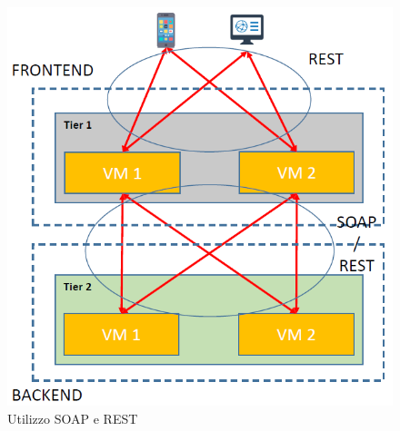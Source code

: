 \documentclass{article}
\begin{document}
\begin{figure}[H]
\centering
\includegraphics[scale=0.5]{img/RestSoap.PNG}
\caption{Utilizzo SOAP e REST}
\end{figure}
\end{document}
